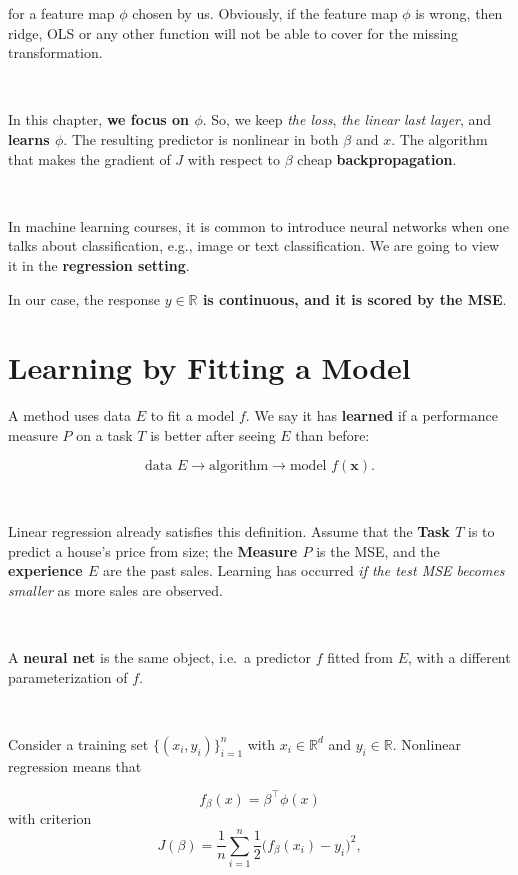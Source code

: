 \documentclass[
]{book}
\begin{document}
for a feature map \(\phi\) chosen by us. Obviously, if the feature map \(\phi\) is wrong, then ridge, OLS or any other function will not be able to cover for the missing transformation.

~

In this chapter, \textbf{we focus on \(\phi\)}. So, we keep \emph{the loss}, \emph{the linear last layer}, and \textbf{learns \(\phi\)}. The resulting predictor is nonlinear in both \(\beta\) and \(x\). The algorithm that makes the gradient of \(J\) with respect to \(\beta\) cheap \textbf{backpropagation}.

~

In machine learning courses, it is common to introduce neural networks when one talks about classification, e.g., image or text classification. We are going to view it in the \textbf{regression setting}.

In our case, the response \textbf{\(y\in\mathbb{R}\) is continuous, and it is scored by the MSE}.

\section{Learning by Fitting a Model}\label{learning-by-fitting-a-model}

A method uses data \(E\) to fit a model \(f\). We say it has \textbf{learned} if a performance measure \(P\) on a task \(T\) is better after seeing \(E\) than before:

\[
\text{data }E \longrightarrow \text{algorithm} \longrightarrow \text{model }f(\mathbf{x}).
\]

~

Linear regression already satisfies this definition. Assume that the \textbf{Task \(T\)} is to predict a house's price from size; the \textbf{Measure \(P\)} is the MSE, and the \textbf{experience \(E\)} are the past sales. Learning has occurred \emph{if the test MSE becomes smaller} as more sales are observed.

~

A \textbf{neural net} is the same object, i.e.~a predictor \(f\) fitted from \(E\), with a different parameterization of \(f\).

~

Consider a training set \(\{(x_{i},y_{i})\}_{i=1}^n\) with \(x_{i}\in\mathbb{R}^d\) and \(y_{i}\in\mathbb{R}\). Nonlinear regression means that

\[
f_\beta(x)=\beta^\top\phi(x)
\]
with criterion
\[
J(\beta)=\frac1n\sum_{i=1}^n\frac12\bigl(f_\beta(x_{i})-y_{i}\bigr)^2,
\]
\end{document}
